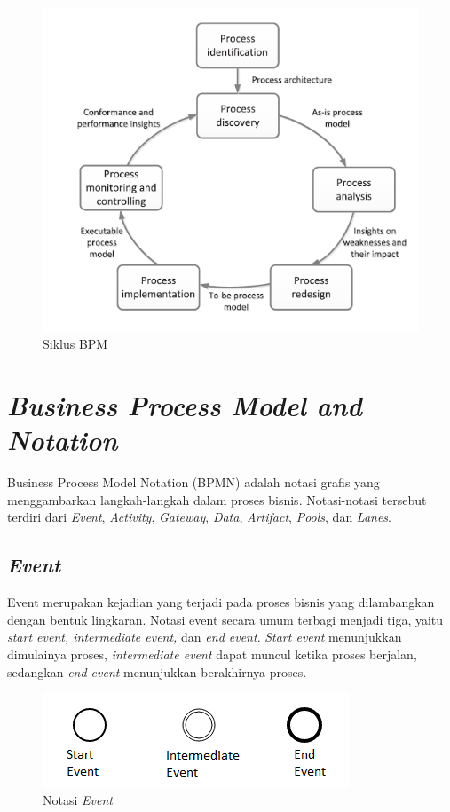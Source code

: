 \begin{figure}[H]
	\centering
	\includegraphics[scale=0.7]{Gambar/Bab-2/2-bpm-lifeCycle}
	\caption{Siklus BPM} 
	\label{siklusbpm}
\end{figure}


\section{\textit{Business Process Model and Notation}}
\label{sec:bpmn}
Business Process Model Notation (BPMN) adalah notasi grafis yang menggambarkan langkah-langkah dalam proses bisnis\cite{bpmn:15:camunda}. Notasi-notasi tersebut terdiri dari \textit{Event}, \textit{Activity}, \textit{Gateway}, \textit{Data}, \textit{Artifact}, \textit{Pools}, dan \textit{Lanes}.

\subsection{\textit{Event}}
\label{sec:event}
Event merupakan kejadian yang terjadi pada proses bisnis yang dilambangkan dengan bentuk lingkaran. Notasi event secara umum terbagi menjadi tiga, yaitu \textit{start event, intermediate event,} dan \textit{end event}. \textit{Start event} menunjukkan dimulainya proses, \textit{intermediate event} dapat muncul ketika proses berjalan, sedangkan \textit{end event} menunjukkan berakhirnya proses.  
\begin{figure}[H]
	\centering
	\includegraphics[scale=1]{Gambar/Bab-2/bpmn/event1}
	\caption{Notasi \textit{Event}} 
	\label{event}
\end{figure}


